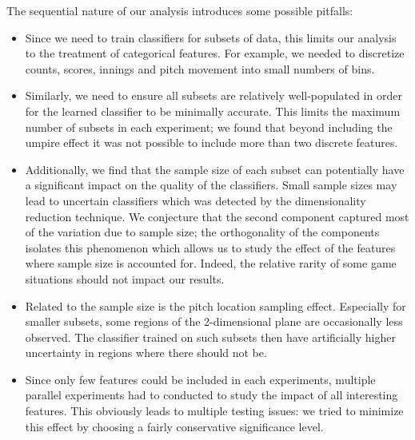 \documentclass[letterpaper,12pt]{article}
\begin{document}
The sequential nature of our analysis introduces some possible pitfalls:
\begin{itemize}
    \item Since we need to train classifiers for subsets of data, this limits our analysis to the treatment of categorical features. For example, we needed to discretize counts, scores, innings and pitch movement into small numbers of bins. 
    \item Similarly, we need to ensure all subsets are relatively well-populated in order for the learned classifier to be minimally accurate. This limits the maximum number of subsets in each experiment; we found that beyond including the umpire effect it was not possible to include more than two discrete features.
    \item Additionally, we find that the sample size of each subset can potentially have a significant impact on the quality of the classifiers. Small sample sizes may lead to uncertain classifiers which was detected by the dimensionality reduction technique. We conjecture that the second component captured most of the variation due to sample size; the orthogonality of the components isolates this phenomenon which allows us to study the effect of the features where sample size is accounted for. Indeed, the relative rarity of some game situations should not impact our results.
    \item Related to the sample size is the pitch location sampling effect. Especially for smaller subsets, some regions of the 2-dimensional plane are occasionally less observed. The classifier trained on such subsets then have artificially higher uncertainty in regions where there should not be.
    \item Since only few features could be included in each experiments, multiple parallel experiments had to conducted to study the impact of all interesting features. This obviously leads to multiple testing issues: we tried to minimize this effect by choosing a fairly conservative significance level.
\end{itemize}
\end{document}
